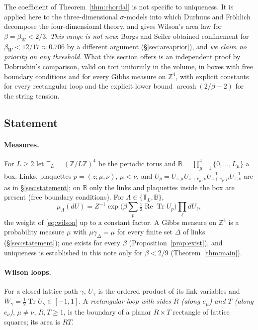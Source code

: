 \documentclass[11pt,a4paper]{article}
\theoremstyle{remark}
\theoremstyle{definition}
\theoremstyle{plain}
\theoremstyle{remark}
\DeclareMathOperator{\arcosh}{arcosh}
\newcommand{\Z}{\mathbb{Z}}
\newcommand{\ReTr}{\operatorname{Re}\operatorname{Tr}}
\begin{document}
The coefficient of Theorem~\ref{thm:chordal} is not specific to uniqueness. It is applied here to the three-dimensional $\sigma$-models into which Durhuus and Fr\"ohlich \cite{DF80} decompose the four-dimensional theory, and gives Wilson's area law for $\beta=\beta_W<2/3$. \emph{This range is not new}: Borgs and Seiler \cite{BS83} obtained confinement for $\beta_W<12/17\approx0.706$ by a different argument (\S\ref{sec:areaprior}), and \emph{we claim no priority on any threshold}. What this section offers is an independent proof by Dobrushin's comparison, valid on tori uniformly in the volume, in boxes with free boundary conditions and for every Gibbs measure on $\Z^4$, with explicit constants for every rectangular loop and the explicit lower bound $\arcosh(2/\beta-2)$ for the string tension.

\subsection{Statement}\label{sec:areastat}

\paragraph{Measures.} For $L\ge2$ let $\mathbb T_L=(\Z/L\Z)^4$ be the periodic torus and $\mathbb B=\prod_{\mu=1}^4\{0,\dots,L_\mu\}$ a box. Links, plaquettes $p=(z;\mu,\nu)$, $\mu<\nu$, and $U_p=U_{z,\mu}U_{z+e_\mu,\nu}U_{z+e_\nu,\mu}^{-1}U_{z,\nu}^{-1}$ are as in \S\ref{sec:statement}; on $\mathbb B$ only the links and plaquettes inside the box are present (free boundary conditions). For $\Lambda\in\{\mathbb T_L,\mathbb B\}$,
\begin{equation}\label{eq:al-fin}
\mu_\Lambda(dU)=Z^{-1}\exp\Big(\beta\sum_p\tfrac12\ReTr U_p\Big)\prod_\ell dU_\ell ,
\end{equation}
the weight of \eqref{eq:wilson} up to a constant factor. A Gibbs measure on $\Z^4$ is a probability measure $\mu$ with $\mu\gamma_\Delta=\mu$ for every finite set $\Delta$ of links (\S\ref{sec:statement}); one exists for every $\beta$ (Proposition~\ref{prop:exist}), and uniqueness is established in this note only for $\beta<2/9$ (Theorem~\ref{thm:main}).

\paragraph{Wilson loops.} For a closed lattice path $\gamma$, $U_\gamma$ is the ordered product of its link variables and $W_\gamma=\frac12\operatorname{Tr}U_\gamma\in[-1,1]$. A \emph{rectangular loop with sides $R$ (along $e_\mu$) and $T$ (along $e_\nu$)}, $\mu\ne\nu$, $R,T\ge1$, is the boundary of a planar $R\times T$ rectangle of lattice squares; its area is $RT$.
\end{document}
